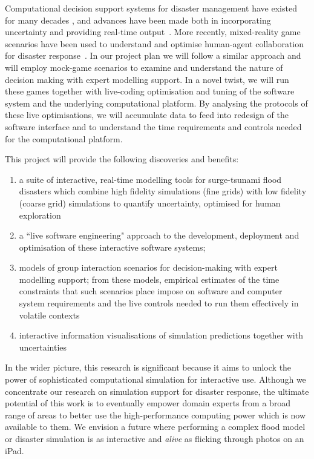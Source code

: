 \documentclass[a4paper,fontsize=12pt]{scrartcl}
\begin{document}
Computational decision support systems for disaster management
have existed for many decades \parencite{wallace_decision_1985}, and
advances have been made both in incorporating
uncertainty \parencite{thompson_social_2014-1,neale_navigating_2015}
and providing real-time output~\parencite{yu_support_2006}. More recently, 
mixed-reality game scenarios have been used to understand and optimise human-agent 
collaboration for disaster response~\parencite{ramchurn2016human}.
In our project plan we will follow a similar approach and will employ mock-game scenarios to examine and understand the nature of decision making with expert modelling support. In a novel twist, we will run these games together with live-coding optimisation and tuning of the software system and the underlying computational platform. By analysing the protocols of these live optimisations, we will accumulate data to feed into redesign of the software interface and to understand the time requirements and controls needed for the computational platform.


This project will provide the following discoveries and benefits:
\begin{enumerate}

\item a suite of interactive, real-time modelling tools for surge-tsunami flood disasters which combine
high fidelity simulations (fine grids) with low fidelity (coarse grid) simulations to quantify
uncertainty, optimised for human exploration


\item a ``live software engineering" approach to the development, deployment 
and optimisation of these interactive software systems; 

\item models of group interaction scenarios for decision-making 
 with expert modelling support; from these models, empirical estimates of  the 
time constraints that such scenarios place impose on software and computer system requirements and the live controls needed to run them effectively in volatile contexts

\item interactive information visualisations of simulation predictions
together with uncertainties
 

\end{enumerate}

In the wider picture, this research is significant because it aims to unlock the power of
sophisticated
computational simulation for interactive use. Although we concentrate
our research on simulation support for disaster response, the
ultimate potential of this work is to eventually empower domain
experts from a broad range of areas to better use the high-performance
computing power which is now available to them. We envision a future
where performing a complex flood model or disaster simulation is as
interactive and \emph{alive} as flicking through photos on an iPad.
\end{document}
